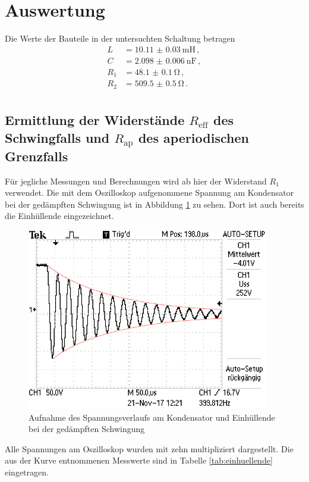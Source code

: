 \section{Auswertung}
\label{sec:Auswertung}
Die Werte der Bauteile in der untersuchten Schaltung betragen
\begin{align*}
  L &= \SI{10.11(003)}{\milli\henry}\,, \\
  C &= \SI{2.098(0006)}{\nano\farad}\,, \\
  R_1 &= \SI{48.1(01)}{\ohm}\,, \\
  R_2 &= \SI{509.5(05)}{\ohm}\,. \\
\end{align*}
\subsection{Ermittlung der Widerstände $R_\text{eff}$ des Schwingfalls und $R_\text{ap}$ des aperiodischen Grenzfalls}
Für jegliche Messungen und Berechnungen wird ab hier der Widerstand $R_1$ verwendet.
Die mit dem Oszilloskop aufgenommene Spannung am Kondensator bei der gedämpften
Schwingung ist in Abbildung \ref{fig:einhuellende} zu sehen. Dort ist auch
bereits die Einhüllende eingezeichnet.

\begin{figure}
  \centering
  \includegraphics[width=300pt]{data/gedaempfte_schwingung2.JPG}
  \caption{Aufnahme des Spannungsverlaufs am Kondensator und Einhüllende bei der
  gedämpften Schwingung}
  \label{fig:einhuellende}
\end{figure}

Alle Spannungen am Oszilloskop wurden mit zehn multipliziert dargestellt. Die
aus der Kurve entnommenen Messwerte sind in Tabelle \ref{tab:einhuellende} eingetragen.

